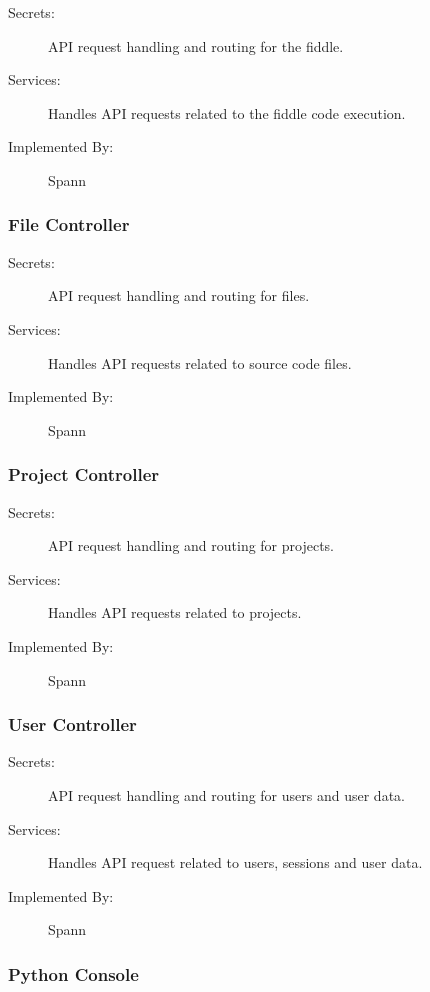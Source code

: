 \documentclass[12pt, titlepage]{article}
\begin{document}
\begin{description}
\item[Secrets:] API request handling and routing for the fiddle.
\item[Services:] Handles API requests related to the fiddle code execution.
\item[Implemented By:] Spann
\end{description}

\subsubsection{File Controller} \label{mdFileController}

\begin{description}
\item[Secrets:] API request handling and routing for files.
\item[Services:] Handles API requests related to source code files.
\item[Implemented By:] Spann
\end{description}

\subsubsection{Project Controller} \label{mdProjectController}

\begin{description}
\item[Secrets:] API request handling and routing for projects.
\item[Services:] Handles API requests related to projects.
\item[Implemented By:] Spann
\end{description}

\subsubsection{User Controller} \label{mdUserController}

\begin{description}
\item[Secrets:] API request handling and routing for users and user data.
\item[Services:] Handles API request related to users, sessions and user data.
\item[Implemented By:] Spann
\end{description}


\subsubsection{Python Console} \label{mdPythonConsole}
\end{document}

